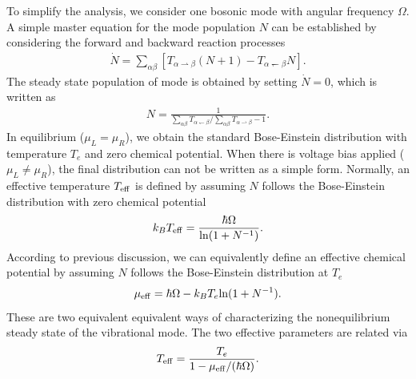 \documentclass[aps,prb,
,floatfix,footinbib,shortbibliography,
preprint
]{revtex4-1}
\begin{document}
To simplify the analysis, we consider one bosonic mode with angular frequency $\Omega$. A simple master equation for the mode population $N$ can be established by considering the forward and backward reaction processes
\begin{align}
	\dot{N} = \sum_{\alpha\beta}\left[T_{\alpha\rightharpoonup\beta} (N+1) - T_{\alpha\leftharpoondown\beta} N\right].
\end{align}
The steady state population of mode is obtained by setting $\dot{N}=0$, which is written as
\begin{align}
	N = \frac{1}{\sum_{\alpha\beta}T_{\alpha\leftharpoondown\beta}/\sum_{\alpha\beta}T_{\alpha\rightharpoonup\beta}-1}.
\end{align}
In equilibrium ($\mu_L=\mu_R$), we obtain the standard Bose-Einstein distribution with temperature $T_e$ and zero chemical potential. When there is voltage bias applied ($\mu_L\neq\mu_R$), the final distribution can not be written as a simple form. Normally, an effective temperature $T_{\rm eff}$ is defined by assuming $N$ follows the Bose-Einstein distribution with zero chemical potential
\begin{align}
	k_BT_{\rm eff} = \frac{\hbar\Omega}{{\rm ln}(1+N^{-1})}.
\end{align}
According to previous discussion, we can equivalently define an effective chemical potential by assuming $N$ follows the Bose-Einstein distribution at $T_e$ 
\begin{align}
	\mu_{\rm eff} = \hbar\Omega - k_BT_e{\rm ln}(1+N^{-1}).
\end{align}
These are two equivalent equivalent ways of characterizing the nonequilibrium steady state of the vibrational mode. The two effective parameters are related via
\begin{align}
	T_{\rm eff} = \frac{T_e}{1-\mu_{\rm eff}/(\hbar\Omega)}.
	\label{eq:tmu}
\end{align}
\end{document}
